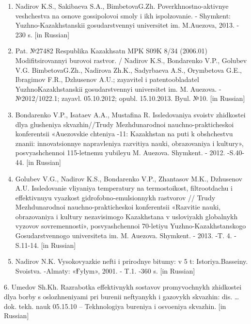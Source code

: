 \begin{enumerate}
\def\labelenumi{\arabic{enumi}.}
\item
  Nadirov K.S., Sakibaeva S.A., BimbetovaG.Zh. Poverkhnostno-aktivnye
  veshchestva na osnove gossipolovoi smoly i ikh
  ispol\textquotesingle zovanie. - Shymkent: Yuzhno-Kazakhstanskii
  gosudarstvennyi universitet im. M.Auezova, 2013. - 230 s. {[}in
  Russian{]}
\item
  Pat. №27482 Respublika Kazakhsatn MPK S09K 8/34 (2006.01)
  Modifitsirovannyi burovoi rastvor. / Nadirov K.S., Bondarenko V.P.,
  Golubev V.G. BimbetovaG.Zh., Nadirova Zh.K., Sadyrbaeva A.S.,
  Orymbetova G.E., Ibragimov F.R., Dzhusenov A.U.;
  zayavitel\textquotesingle{} i patentoobladatel\textquotesingle{}
  YuzhnoKazakhstanskii gosudarstvennyi universitet im. M. Auezova.
  -№2012/1022.1; zayavl. 05.10.2012; opubl. 15.10.2013. Byul. №10. {[}in
  Russian{]}
\item
  Bondarenko V.P., Isataev A.A., Mustafina R. Issledovaniya svoistv
  zhidkostei dlya glusheniya skvazhin//Trudy Mezhdunarodnoi
  nauchno-prakticheskoi konferentsii «Auezovskie chteniya -11:
  Kazakhstan na puti k obshchestvu znanii: innovatsionnye napravleniya
  razvitiya nauki, obrazovaniya i kul\textquotesingle tury»,
  posvyashchennoi 115-letnemu yubileyu M. Auezova. Shymkent. - 2012.
  -S.40-44. {[}in Russian{]}
\item
  Golubev V.G., Nadirov K.S., Bondarenko V.P., Zhantasov M.K., Dzhusenov
  A.U. Issledovanie vliyaniya temperatury na
  termostoikost\textquotesingle, fil\textquotesingle trootdachu i
  effektivnuyu vyazkost\textquotesingle{}
  gidrofobno-emul\textquotesingle sionnykh rastvorov // Trudy
  Mezhdunarodnoi nauchno-prakticheskoi konferentsii «Razvitie nauki,
  obrazovaniya i kul\textquotesingle tury nezavisimogo Kazakhstana v
  usloviyakh global\textquotesingle nykh vyzovov sovremennosti»,
  posvyashchennoi 70-letiyu Yuzhno-Kazakhstanskogo Gosudarstvennogo
  universiteta im. M. Auezova. Shymkent. - 2013. -T. 4. - S.11-14. {[}in
  Russian{]}
\item
  Nadirov N.K. Vysokovyazkie nefti i prirodnye bitumy: v 5 t:
  Istoriya.Basseiny. Svoistva. -Almaty: «Ғylym», 2001. - T.1. -360 s.
  {[}in Russian{]}
\end{enumerate}

6. Umedov Sh.Kh. Razrabotka effektivnykh sostavov promyvochnykh
zhidkostei dlya bor\textquotesingle by s oslozhneniyami pri burenii
neftyanykh i gazovykh skvazhin: dis. \ldots{} dok. tekh. nauk 05.15.10
-- Tekhnologiya bureniya i osvoeniya skvazhin. {[}in Russian{]}

